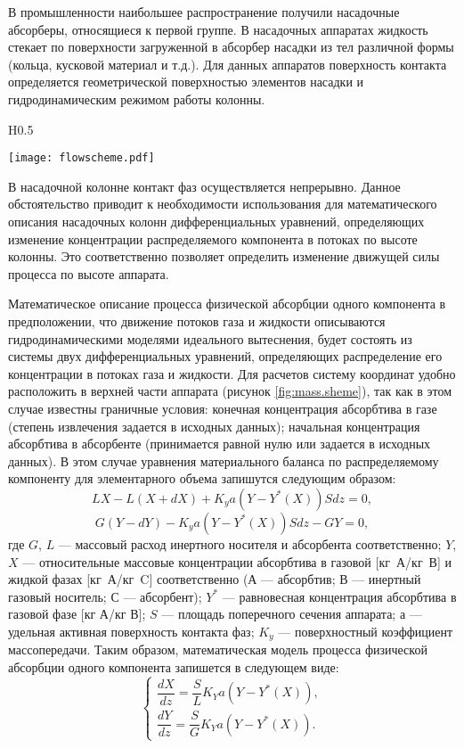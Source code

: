 В промышленности наибольшее распространение получили насадочные абсорберы, относящиеся к первой группе. В насадочных аппаратах жидкость стекает по поверхности загруженной в абсорбер насадки из тел различной формы (кольца, кусковой материал и т.д.). Для данных аппаратов поверхность контакта определяется геометрической поверхностью элементов насадки и гидродинамическим режимом работы колонны.
\begin{wrapfigure}{H}{0.5\textwidth}
	\begin{center}
		\texttt{[image: flowscheme.pdf]}
	\end{center}
	\caption{ Схема проведения процесса абсорбции (противоточная)} \label{fig:mass.sheme}
\end{wrapfigure}

В насадочной колонне контакт фаз осуществляется непрерывно. Данное обстоятельство приводит к необходимости использования для математического описания насадочных колонн дифференциальных уравнений, определяющих изменение концентрации распределяемого компонента в потоках по высоте колонны. Это соответственно позволяет определить изменение движущей силы процесса по высоте аппарата.

Математическое описание процесса физической абсорбции одного компонента в предположении, что движение потоков газа и жидкости описываются гидродинамическими моделями идеального вытеснения, будет состоять из системы двух дифференциальных уравнений, определяющих распределение его концентрации в потоках газа и жидкости. Для расчетов систему координат удобно расположить в верхней части аппарата (рисунок \ref{fig:mass.sheme}), так как в этом случае известны граничные условия: конечная концентрация абсорбтива в газе (степень извлечения задается в исходных данных); начальная концентрация абсорбтива в абсорбенте (принимается равной нулю или задается в исходных данных). В этом случае уравнения материального баланса по распределяемому компоненту для элементарного объема  запишутся следующим образом:
\begin{equation}
	L X - L(X +dX) + K_y a (Y-Y^*(X))Sdz=0, 
\end{equation}
\begin{equation}
	G(Y-dY)-K_y a (Y-Y^*(X))Sdz- GY=0,
\end{equation}
где $G$, $L$ --- массовый расход инертного носителя и абсорбента соответственно; $Y$, $X$ --- относительные массовые концентрации абсорбтива в газовой [кг А/кг В] и жидкой фазах [кг А/кг C] соответственно (А --- абсорбтив; В --- инертный газовый носитель; С --- абсорбент); $Y^*$ --- равновесная концентрация абсорбтива в газовой фазе [кг А/кг В]; $S$ --- площадь поперечного сечения аппарата; $а$ --- удельная активная поверхность контакта фаз; $K_y$ --- поверхностный коэффициент массопередачи. Таким образом, математическая модель процесса физической абсорбции одного компонента запишется в следующем виде:
\begin{equation}
\left\lbrace 
\begin{gathered} 
\dfrac{dX}{dz}=\dfrac{S}{L} K_Y a (Y-Y^*(X)),
\\
\dfrac{dY}{dz}=\dfrac{S}{G} K_Y a (Y-Y^*(X)).
\end{gathered} 
\right.
\end{equation}

